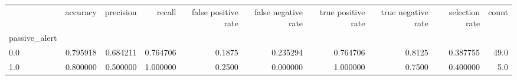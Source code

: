 \begin{tabular}{lrrrrrrrrr}
\toprule
{} &  accuracy &  precision &    recall &  false positive rate &  false negative rate &  true positive rate &  true negative rate &  selection rate &  count \\
passive\_alert &           &            &           &                      &                      &                     &                     &                 &        \\
\midrule
0.0           &  0.795918 &   0.684211 &  0.764706 &               0.1875 &             0.235294 &            0.764706 &              0.8125 &        0.387755 &   49.0 \\
1.0           &  0.800000 &   0.500000 &  1.000000 &               0.2500 &             0.000000 &            1.000000 &              0.7500 &        0.400000 &    5.0 \\
\bottomrule
\end{tabular}
